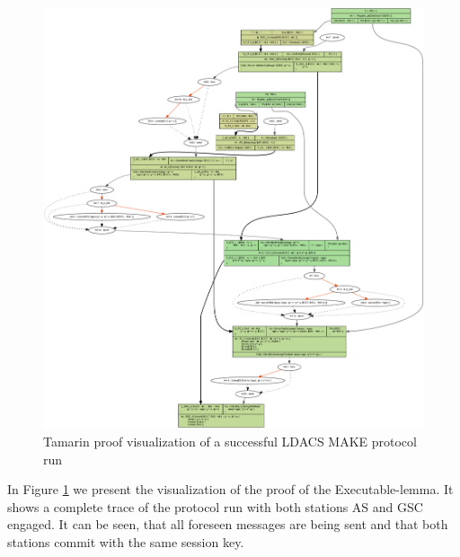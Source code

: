 \begin{figure}
		\includegraphics[width=\textwidth]{img/tamarin.png}
		 \caption{Tamarin proof visualization of a successful LDACS MAKE protocol run}
 	\label{fig:figure4}
\end{figure} 

In Figure \ref{fig:figure4} we present the visualization of the proof of the Executable-lemma. It shows a complete trace of the protocol run with both stations AS and GSC engaged. 
It can be seen, that all foreseen messages are being sent and that both stations commit with the same session key.